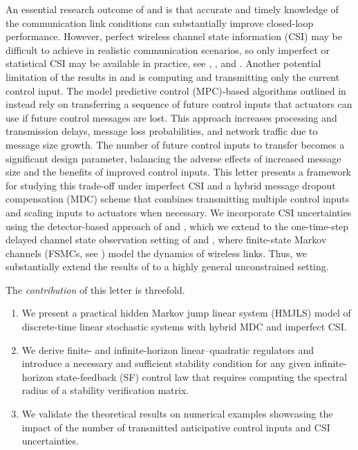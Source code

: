 \documentclass[letterpaper, 10 pt, conference]{ieeeconf}  %
\begin{document}
An essential research outcome of \cite{yZL-2025-automatica} and \cite{impicciatore2024tac} is that accurate and timely knowledge of the communication link conditions can substantially improve closed-loop performance. However, perfect wireless channel state information (CSI) may be difficult to achieve in realistic communication scenarios, so only imperfect or statistical CSI may be available in practice, see \cite{zheng2022survey}, \cite{pourkabirian2021robust}, and \cite{akgun2024interference}. Another potential limitation of the results in \cite{yZL-2025-automatica} and \cite{impicciatore2024tac} is computing and transmitting only the current control input. The model predictive control (MPC)-based algorithms outlined in \cite{pezzutto2024arc} instead rely on transferring a sequence of future control inputs that actuators can use if future control messages are lost. This approach increases processing and transmission delays, message loss probabilities, and network traffic due to message size growth. The number of future control inputs to transfer becomes a significant design parameter, balancing the adverse effects of increased message size and the benefits of improved control inputs. This letter presents a framework for studying this trade-off under imperfect CSI and a hybrid message dropout compensation (MDC) scheme that combines transmitting multiple control inputs and scaling inputs to actuators when necessary.
We incorporate CSI uncertainties using the detector-based approach of \cite{costa2015detector} and \cite{deoliveira2018mixed}, which we extend to the one-time-step delayed channel state observation setting of \cite{yZL-2025-automatica} and \cite{impicciatore2024tac}, where finite-state Markov channels (FSMCs, see \cite{sadeghi2008finite}) model the dynamics of wireless links. Thus, we substantially extend the results of \cite{yZL-2025-automatica} to a highly general unconstrained setting.

The \textit{contribution} of this letter is threefold.
\begin{enumerate}
    \item We present a practical hidden Markov jump linear system (HMJLS) model of discrete-time linear stochastic systems with hybrid MDC and imperfect CSI.
    \item We derive finite- and infinite-horizon linear--quadratic regulators and introduce a necessary and sufficient stability condition for any given infinite-horizon state-feedback (SF) control law that requires computing the spectral radius of a stability verification matrix.
    \item We validate the theoretical results on numerical examples showcasing the impact of the number of transmitted anticipative control inputs and CSI uncertainties.
\end{enumerate}
\end{document}
